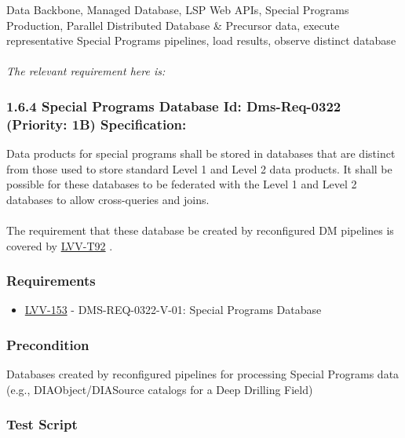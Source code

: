 Data Backbone, Managed Database, LSP Web APIs, Special Programs
Production, Parallel Distributed Database \& Precursor data, execute
representative Special Programs pipelines, load results, observe
distinct database\\
~\\
\emph{The relevant requirement here is:}\\

\hypertarget{special-programs-database-id-dms-req-0322-priority-1b-specification}{%
\subsubsection{1.6.4 Special Programs Database Id: Dms-Req-0322
(Priority: 1B)
Specification:}\label{special-programs-database-id-dms-req-0322-priority-1b-specification}}

Data products for special programs shall be stored in databases that are
distinct from those used to store standard Level 1 and Level 2 data
products. It shall be possible for these databases to be federated with
the Level 1 and Level 2 databases to allow cross-queries and joins.\\
~\\
The requirement that these database be created by reconfigured DM
pipelines is covered by
\href{https://jira.lsstcorp.org/secure/Tests.jspa\#/testCase/LVV-T92}{LVV-T92}
.

\hypertarget{requirements-71}{%
\subsubsection{Requirements}\label{requirements-71}}

\begin{itemize}
\tightlist
\item
  \href{https://jira.lsstcorp.org/browse/LVV-153}{LVV-153} -
  DMS-REQ-0322-V-01: Special Programs Database
\end{itemize}

\hypertarget{precondition-13}{%
\subsubsection{Precondition}\label{precondition-13}}

Databases created by reconfigured pipelines for processing Special
Programs data (e.g., DIAObject/DIASource catalogs for a Deep Drilling
Field)

\hypertarget{test-script-71}{%
\subsubsection{Test Script}\label{test-script-71}}

